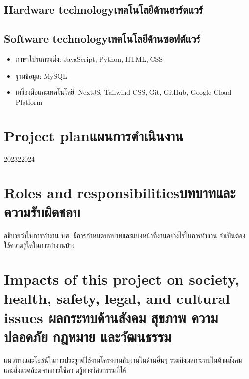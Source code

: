 \subsection{\ifenglish Hardware technology\else เทคโนโลยีด้านฮาร์ดแวร์\fi}

\subsection{\ifenglish Software technology\else เทคโนโลยีด้านซอฟต์แวร์\fi}
\begin{itemize}
    \item ภาษาโปรแกรมมิ่ง: JavaScript, Python, HTML, CSS
    \item ฐานข้อมูล: MySQL
    \item เครื่องมือและเทคโนโลยี: NextJS, Tailwind CSS, Git, GitHub, Google Cloud Platform
\end{itemize}

\section{\ifenglish Project plan\else แผนการดำเนินงาน\fi}

\begin{plan}{6}{2023}{2}{2024}
\end{plan}

\section{\ifenglish Roles and responsibilities\else บทบาทและความรับผิดชอบ\fi}
อธิบายว่าในการทำงาน นศ. มีการกำหนดบทบาทและแบ่งหน้าที่งานอย่างไรในการทำงาน จำเป็นต้องใช้ความรู้ใดในการทำงานบ้าง

\section{\ifenglish%
Impacts of this project on society, health, safety, legal, and cultural issues
\else%
ผลกระทบด้านสังคม สุขภาพ ความปลอดภัย กฎหมาย และวัฒนธรรม
\fi}

แนวทางและโยชน์ในการประยุกต์ใช้งานโครงงานกับงานในด้านอื่นๆ รวมถึงผลกระทบในด้านสังคมและสิ่งแวดล้อมจากการใช้ความรู้ทางวิศวกรรมที่ได้
